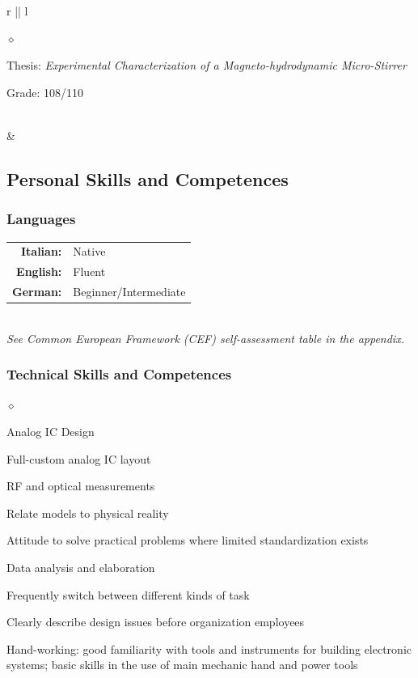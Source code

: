 \documentclass[a4paper]{article}
\newlength{\sectsep}
\renewenvironment{itemize}{
  \begin{list}{$\diamond$}{
    \setlength{\topsep}{0.25em}
    \setlength{\itemsep}{0em}
    \setlength{\parskip}{0pt}
    \setlength{\parsep}{0em}
  }
}{
  \end{list}
}
\begin{document}
\begin{longtable}{r || l}
\begin{minipage}{0.9\textwidth}
      \begin{itemize}
          \item Thesis: \emph{Experimental Characterization of a Magneto-hydrodynamic Micro-Stirrer}
          \item Grade: 108/110
      \end{itemize}
      \vfill
  \end{minipage} \\

  & \begin{minipage}{0.9\textwidth}
      \vspace{0.2\sectsep}
      \subsection*{Personal Skills and Competences}
      \subsubsection*{Languages}
      \begin{tabular}{rl}
        \textbf{Italian:}&Native\\
        \textbf{English:}&Fluent\\
        \textbf{German:}&Beginner/Intermediate\\
      \end{tabular} \vspace{1.5ex} \\
      \hspace*{0.5em} {\footnotesize \emph{See Common European Framework (CEF) self-assessment table in the appendix.}}

      \subsubsection*{Technical Skills and Competences}
      \begin{itemize}
          \item Analog IC Design
          \item Full-custom analog IC layout
          \item RF and optical measurements
          \item Relate models to physical reality
          \item Attitude to solve practical problems where limited standardization exists
          \item Data analysis and elaboration
          \item Frequently switch between different kinds of task
          \item Clearly describe design issues before organization employees
          \item Hand-working: good familiarity with tools and instruments for building electronic systems; basic skills in the use of main mechanic hand and power tools
      \end{itemize}


\end{minipage}
\end{longtable}
\end{document}
